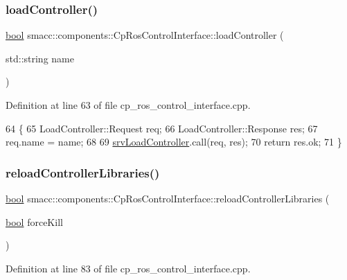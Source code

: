 \subsubsection{\texorpdfstring{load\+Controller()}{loadController()}}
{\footnotesize\ttfamily \hyperlink{classbool}{bool} smacc\+::components\+::\+Cp\+Ros\+Control\+Interface\+::load\+Controller (\begin{DoxyParamCaption}\item[{std\+::string}]{name }\end{DoxyParamCaption})}



Definition at line 63 of file cp\+\_\+ros\+\_\+control\+\_\+interface.\+cpp.


\begin{DoxyCode}
64 \{
65     LoadController::Request req;
66     LoadController::Response res;
67     req.name = name;
68 
69     \hyperlink{classsmacc_1_1components_1_1CpRosControlInterface_aa6c1440534d6a825644f0c3620461b72}{srvLoadController}.call(req, res);
70     \textcolor{keywordflow}{return} res.ok;
71 \}
\end{DoxyCode}
\mbox{\label{classsmacc_1_1components_1_1CpRosControlInterface_acd3534897ecf6b28ee3804dcbefedae9}} 
\subsubsection{\texorpdfstring{reload\+Controller\+Libraries()}{reloadControllerLibraries()}}
{\footnotesize\ttfamily \hyperlink{classbool}{bool} smacc\+::components\+::\+Cp\+Ros\+Control\+Interface\+::reload\+Controller\+Libraries (\begin{DoxyParamCaption}\item[{\hyperlink{classbool}{bool}}]{force\+Kill }\end{DoxyParamCaption})}



Definition at line 83 of file cp\+\_\+ros\+\_\+control\+\_\+interface.\+cpp.



